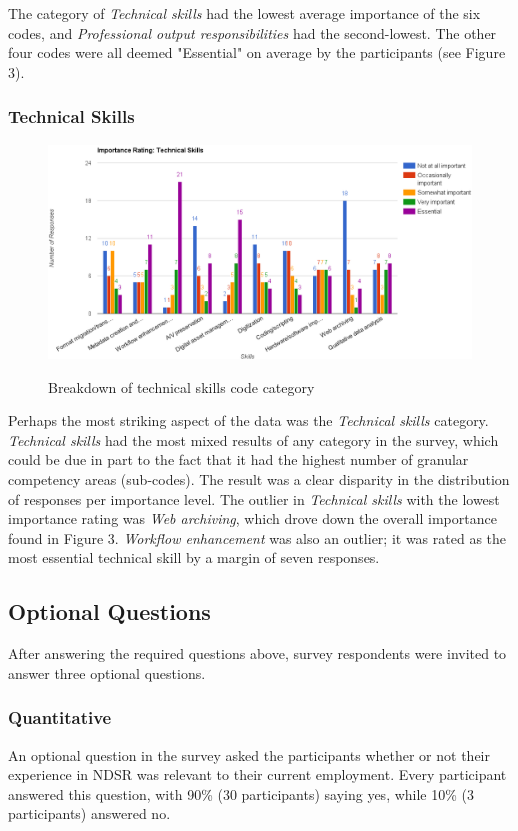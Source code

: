 \documentclass{acm_proc_article-sp}
\begin{document}
The category of \textit{Technical skills} had the lowest average importance of the six codes, and \textit{Professional output responsibilities} had the second-lowest. The other four codes were all deemed "Essential" on average by the participants (see Figure 3). 

\subsubsection{Technical Skills}
\begin{figure}
\centering
	\includegraphics[keepaspectratio, scale=0.5]{tech_skills.png} 
	\label{Figure 4.}
	\caption{Breakdown of technical skills code category}
\end{figure}
Perhaps the most striking aspect of the data was the \textit{Technical skills} category. \textit{Technical skills} had the most mixed results of any category in the survey, which could be due in part to the fact that it had the highest number of granular competency areas (sub-codes). The result was a clear disparity in the distribution of responses per importance level. The outlier in \textit{Technical skills} with the lowest importance rating was \textit{Web archiving}, which drove down the overall importance found in Figure 3. \textit{Workflow enhancement} was also an outlier; it was rated as the most essential technical skill by a margin of seven responses. 

\subsection{Optional Questions}
After answering the required questions above, survey respondents were invited to answer three optional questions.

\subsubsection{Quantitative}
An optional question in the survey asked the participants whether or not their experience in NDSR was relevant to their current employment. Every participant answered this question, with 90\% (30 participants) saying yes, while 10\% (3 participants) answered no.
\end{document}
